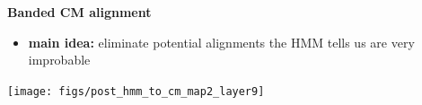 \documentclass[landscape]{slides}
\begin{document}
\begin{slide}
\begin{center}
\large
\textbf{Banded CM alignment}
\end{center}
\medskip
\small
\begin{itemize}
\item
\textbf{main idea:} eliminate potential alignments the HMM tells us are very improbable
\end{itemize}
\begin{center}
\texttt{[image: figs/post\_hmm\_to\_cm\_map2\_layer9]}
\end{center}
\vfill
\end{slide}
\end{document}
